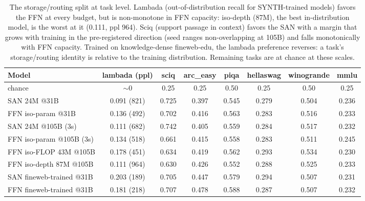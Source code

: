 \begin{table}[t]\centering\footnotesize
\begin{tabular}{lccccccc}
\toprule
Model & lambada (ppl) & sciq & arc\_easy & piqa & hellaswag & winogrande & mmlu \\
\midrule
chance & $\sim$0 & 0.25 & 0.25 & 0.50 & 0.25 & 0.50 & 0.25 \\
\midrule
SAN 24M @31B & 0.091 (821) & 0.725 & 0.397 & 0.545 & 0.279 & 0.504 & 0.236 \\
FFN iso-param @31B & 0.136 (492) & 0.702 & 0.416 & 0.563 & 0.283 & 0.516 & 0.233 \\
SAN 24M @105B (3s) & 0.111 (682) & 0.742 & 0.405 & 0.559 & 0.284 & 0.517 & 0.232 \\
FFN iso-param @105B (3s) & 0.134 (518) & 0.661 & 0.415 & 0.558 & 0.283 & 0.511 & 0.245 \\
FFN iso-FLOP 43M @105B & 0.178 (451) & 0.634 & 0.419 & 0.562 & 0.293 & 0.534 & 0.230 \\
FFN iso-depth 87M @105B & 0.111 (964) & 0.630 & 0.426 & 0.552 & 0.288 & 0.525 & 0.233 \\
\midrule
SAN fineweb-trained @31B & 0.203 (189) & 0.705 & 0.447 & 0.579 & 0.294 & 0.507 & 0.231 \\
FFN fineweb-trained @31B & 0.181 (218) & 0.707 & 0.478 & 0.588 & 0.287 & 0.507 & 0.232 \\
\bottomrule
\end{tabular}
\caption{The storage/routing split at task level. Lambada (out-of-distribution
recall for SYNTH-trained models) favors the FFN at every budget, but is
non-monotone in FFN capacity: iso-depth (87M), the best in-distribution model,
is the worst at it (0.111, ppl 964). Sciq (support passage in context) favors
the SAN with a margin that grows with training in the pre-registered direction
(seed ranges non-overlapping at 105B) and falls monotonically with FFN
capacity. Trained on knowledge-dense fineweb-edu, the lambada preference
reverses: a task's storage/routing identity is relative to the training
distribution. Remaining tasks are at chance at these scales.}
\label{tab:downstream}
\end{table}
